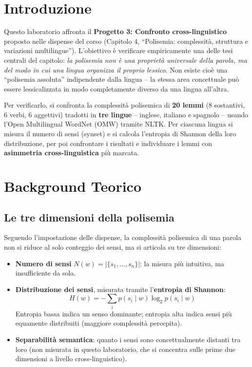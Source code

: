 \documentclass[12pt,a4paper]{article}
\begin{document}
\section{Introduzione}

Questo laboratorio affronta il \textbf{Progetto 3: Confronto cross-linguistico} proposto nelle dispense del corso (Capitolo 4, ``Polisemia: complessit\`a, struttura e variazioni multilingue''). L'obiettivo \`e verificare empiricamente una delle tesi centrali del capitolo: \emph{la polisemia non \`e una propriet\`a universale della parola, ma del modo in cui una lingua organizza il proprio lessico}. Non esiste cio\`e una ``polisemia assoluta'' indipendente dalla lingua -- la stessa area concettuale pu\`o essere lessicalizzata in modo completamente diverso da una lingua all'altra.

Per verificarlo, si confronta la complessit\`a polisemica di \textbf{20 lemmi} (8 sostantivi, 6 verbi, 6 aggettivi) tradotti in \textbf{tre lingue} -- inglese, italiano e spagnolo -- usando l'Open Multilingual WordNet (OMW) tramite NLTK. Per ciascuna lingua si misura il numero di sensi (synset) e si calcola l'entropia di Shannon della loro distribuzione, per poi confrontare i risultati e individuare i lemmi con \textbf{asimmetria cross-linguistica} pi\`u marcata.

\section{Background Teorico}

\subsection{Le tre dimensioni della polisemia}

Seguendo l'impostazione delle dispense, la complessit\`a polisemica di una parola non si riduce al solo conteggio dei sensi, ma si articola su tre dimensioni:

\begin{itemize}
  \item \textbf{Numero di sensi} $N(w) = |\{s_1, \dots, s_n\}|$: la misura pi\`u intuitiva, ma insufficiente da sola.
  \item \textbf{Distribuzione dei sensi}, misurata tramite l'\textbf{entropia di Shannon}:
  \[
    H(w) = -\sum_i p(s_i \mid w) \log_2 p(s_i \mid w)
  \]
  Entropia bassa indica un senso dominante; entropia alta indica sensi pi\`u equamente distribuiti (maggiore complessit\`a percepita).
  \item \textbf{Separabilit\`a semantica}: quanto i sensi sono concettualmente distanti tra loro (non misurata in questo laboratorio, che si concentra sulle prime due dimensioni a livello cross-linguistico).
\end{itemize}
\end{document}
